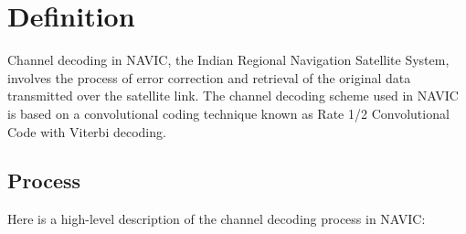 \documentclass[10pt, onecolumn]{article}
\title{\mytitle}
\author{\myauthor\hspace{1em}\\\contact\\FWC22089 -\hspace{0.5em}IITH\hspace{0.5em}\mymodule\hspace{6em}}
\begin{document}
\maketitle
\section{Definition}
Channel decoding in NAVIC, the Indian Regional Navigation Satellite System, involves the process of error correction and retrieval of the original data transmitted over the satellite link. The channel decoding scheme used in NAVIC is based on a convolutional coding technique known as Rate 1/2 Convolutional Code with Viterbi decoding.
\subsection{Process}
Here is a high-level description of the channel decoding process in NAVIC:




\end{document}
